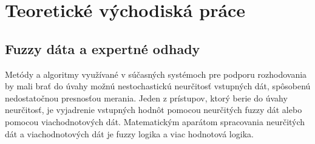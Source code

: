 \chapter{Teoretické východiská práce} 

\section{Fuzzy dáta a expertné odhady}
Metódy a algoritmy využívané v súčasných systémoch pre podporu rozhodovania by mali brať do úvahy možnú nestochastickú neurčitosť vstupných dát, spôsobenú nedostatočnou presnosťou merania. Jeden z prístupov, ktorý berie do úvahy neurčitosť, je vyjadrenie vstupných hodnôt pomocou neurčitých fuzzy dát alebo pomocou viachodnotových dát. 
Matematickým aparátom spracovania neurčitých dát a viachodnotových dát je fuzzy logika a viac hodnotová logika. \cite{levashenkoProj}

